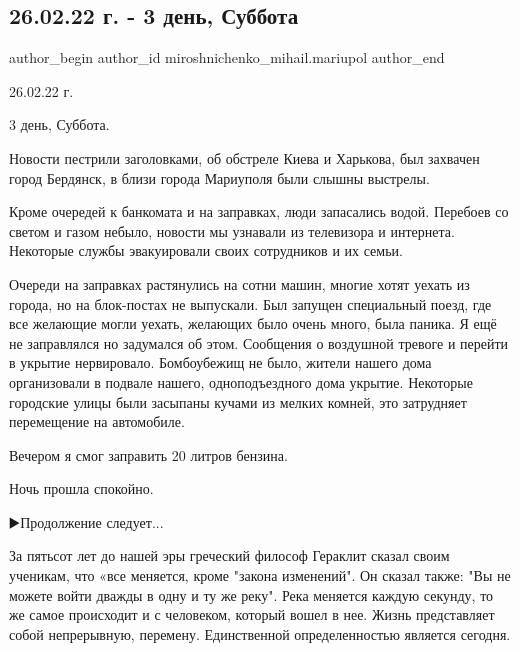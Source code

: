 
 
 
 
 

\subsection{26.02.22 г. - 3 день, Суббота}
\label{sec:26_02_2023.fb.miroshnichenko_mihail.mariupol.1.26_02_22_g____3_den_}

\ifcmt
 author_begin
   author_id miroshnichenko_mihail.mariupol
 author_end
\fi

26.02.22 г.

3 день, Суббота.

Новости пестрили заголовками,  об обстреле Киева и Харькова,  был захвачен
город Бердянск, в близи города Мариуполя были слышны выстрелы.

Кроме очередей к банкомата и на заправках, люди запасались водой. Перебоев со
светом и газом небыло, новости мы узнавали из телевизора и интернета. Некоторые
службы эвакуировали своих сотрудников и их семьи.

Очереди на заправках растянулись на сотни машин, многие хотят уехать из города,
но на блок-постах не выпускали. Был запущен специальный поезд, где все желающие
могли уехать, желающих было очень много, была паника. Я ещё не заправлялся но
задумался об этом. Сообщения о воздушной тревоге и перейти в укрытие
нервировало. Бомбоубежищ не было, жители нашего дома организовали в подвале
нашего, одноподъездного дома укрытие. Некоторые городские улицы были засыпаны
кучами из мелких комней, это затрудняет перемещение на автомобиле.

Вечером я смог заправить 20 литров бензина.

Ночь прошла спокойно.

▶️Продолжение следует...

За пятьсот лет до нашей эры греческий философ Гераклит сказал своим ученикам,
что «все меняется, кроме "закона изменений". Он сказал также: "Вы не можете
войти дважды в одну и ту же реку". Река меняется каждую секунду, то же самое
происходит и с человеком, который вошел в нее. Жизнь представляет собой
непрерывную, перемену. Единственной определенностью является сегодня.

